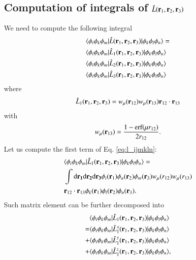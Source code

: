 \documentclass[aip,jcp,reprint,noshowkeys,superscriptaddress]{revtex4-1}
\newcommand{\matelem}[3]{\langle #1 | #2 | #3 \rangle}
\newcommand{\bri}[1]{{\bf r}_{#1}}
\newcommand{\dr}[1]{\text{d}{\bf r_{#1}}}
\begin{document}
\subsection{Computation of integrals of $\hat{L}(\bri{1},\bri{2},\bri{3})$}
We need to compute the following integral 
\begin{equation}
 \label{eq:l_ijmkln}
 \begin{aligned}
 & \matelem{\phi_i \phi_k \phi_m}{\hat{L}(\bri{1},\bri{2},\bri{3})}{\phi_k \phi_l \phi_n} = \\
 & \matelem{\phi_i \phi_k \phi_m}{\hat{L}_1(\bri{1},\bri{2},\bri{3})}{\phi_k \phi_l \phi_n} \\
 & \matelem{\phi_i \phi_k \phi_m}{\hat{L}_2(\bri{1},\bri{2},\bri{3})}{\phi_k \phi_l \phi_n} \\
 & \matelem{\phi_i \phi_k \phi_m}{\hat{L}_3(\bri{1},\bri{2},\bri{3})}{\phi_k \phi_l \phi_n} 
 \end{aligned}
\end{equation}
where 
\begin{equation}
 \hat{L}_1(\bri{1},\bri{2},\bri{3}) = w_\mu(\bri{12}) w_\mu(\bri{13}) \bri{12} \cdot \bri{13}
\end{equation}
with 
\begin{equation}
 w_\mu(\bri{13}) = \frac{1 - \text{erf}(\mu r_{12})}{2 r_{12}}.
\end{equation}
Let us compute the first term of Eq. \eqref{eq:l_ijmkln}:
\begin{equation}
 \begin{aligned}
 & \matelem{\phi_i \phi_k \phi_m}{\hat{L}_1(\bri{1},\bri{2},\bri{3})}{\phi_k \phi_l \phi_n} = \\
 & \int \dr{1} \dr{2} \dr{3} \phi_i(\bri{1}) \phi_u(\bri{2}) \phi_m(\bri{3}) w_{\mu}(r_{12}) w_{\mu}(r_{13}) \\ 
 &\bri{12} \cdot \bri{13}  \phi_k(\bri{1}) \phi_l(\bri{2}) \phi_n(\bri{3}).
 \end{aligned}
\end{equation}
Such matrix element can be further decomposed into
\begin{equation}
 \begin{aligned}
 & \matelem{\phi_i \phi_k \phi_m}{\hat{L}_1(\bri{1},\bri{2},\bri{3})}{\phi_k \phi_l \phi_n}  \\
 =& \matelem{\phi_i \phi_k \phi_m}{\hat{L}_1^x(\bri{1},\bri{2},\bri{3})}{\phi_k \phi_l \phi_n} \\  
+ & \matelem{\phi_i \phi_k \phi_m}{\hat{L}_1^y(\bri{1},\bri{2},\bri{3})}{\phi_k \phi_l \phi_n} \\  
+ & \matelem{\phi_i \phi_k \phi_m}{\hat{L}_1^z(\bri{1},\bri{2},\bri{3})}{\phi_k \phi_l \phi_n},  
 \end{aligned}
\end{equation}
\end{document}
